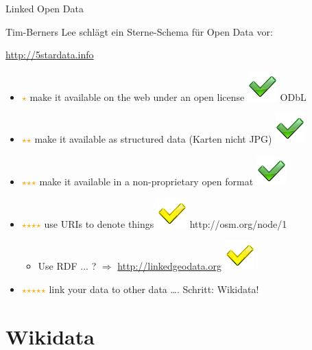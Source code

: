 \documentclass{beamer}
\newcommand{\boldm}[1] {\mathversion{bold}#1\mathversion{normal}}
\begin{document}
\begin{frame}{Linked Open Data}

  Tim-Berners Lee schlägt ein Sterne-Schema für Open Data vor:
 \vspace*{0.4cm}

  \url{http://5stardata.info}
 \vspace*{0.4cm}

  \begin{itemize}
    \item[] \textcolor{orange}{\boldm$\star$} make it available on the web under an open license \pause \includegraphics[width=.3cm]{check.png} ODbL \pause
    \item[] \textcolor{orange}{\boldm$\star$$\star$} make it available as structured data (Karten nicht JPG) \pause  \includegraphics[width=.3cm]{check.png} \pause
    \item[] \textcolor{orange}{\boldm$\star$$\star$$\star$} make it available in a non-proprietary open format \pause  \includegraphics[width=.3cm]{check.png} \pause
    \item[] \textcolor{orange}{\boldm$\star$$\star$$\star$$\star$} use URIs to denote things \pause  \includegraphics[width=.3cm]{check-yellow.png} http://osm.org/node/1 \pause
    \begin{itemize}
      \item[] \hspace{0.5cm}Use RDF ... ? \pause $\Rightarrow$ \url{http://linkedgeodata.org} \includegraphics[width=.3cm]{check-yellow.png} \pause
    \end{itemize}
    \item[] \textcolor{orange}{\boldm$\star$$\star$$\star$$\star$$\star$} link your data to other data \dots {}. Schritt: Wikidata!
  \end{itemize}


\end{frame}

\section{Wikidata}
\end{document}
